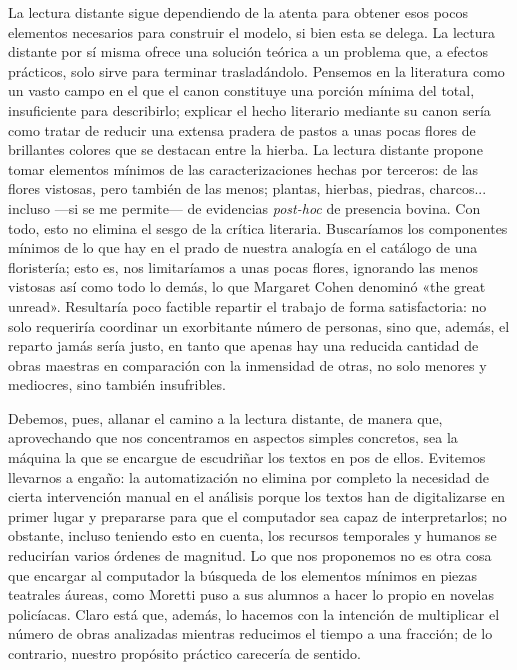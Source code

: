 La lectura distante sigue dependiendo de la atenta para obtener esos pocos elementos necesarios para construir el modelo, si bien esta se delega. La lectura distante por sí misma ofrece una solución teórica a un problema que, a efectos prácticos, solo sirve para terminar trasladándolo. Pensemos en la literatura como un vasto campo en el que el canon constituye una porción mínima del total, insuficiente para describirlo; explicar el hecho literario mediante su canon sería como tratar de reducir una extensa pradera de pastos a unas pocas flores de brillantes colores que se destacan entre la hierba. La lectura distante propone tomar elementos mínimos de las caracterizaciones hechas por terceros: de las flores vistosas, pero también de las menos; plantas, hierbas, piedras, charcos... incluso —si se me permite— de evidencias \textit{post-hoc} de presencia bovina. Con todo, esto no elimina el sesgo de la crítica literaria. Buscaríamos los componentes mínimos de lo que hay en el prado de nuestra analogía en el catálogo de una floristería; esto es, nos limitaríamos a unas pocas flores, ignorando las menos vistosas así como todo lo demás, lo que Margaret Cohen \parencite*[23]{cohen1999} denominó «the great unread». Resultaría poco factible repartir el trabajo de forma satisfactoria: no solo requeriría coordinar un exorbitante número de personas, sino que, además, el reparto jamás sería justo, en tanto que apenas hay una reducida cantidad de obras maestras en comparación con la inmensidad de otras, no solo menores y mediocres, sino también insufribles. 

Debemos, pues, allanar el camino a la lectura distante, de manera que, aprovechando que nos concentramos en aspectos simples concretos, sea la máquina la que se encargue de escudriñar los textos en pos de ellos. Evitemos llevarnos a engaño: la automatización no elimina por completo la necesidad de cierta intervención manual en el análisis porque los textos han de digitalizarse en primer lugar y prepararse para que el computador sea capaz de interpretarlos; no obstante, incluso teniendo esto en cuenta, los recursos temporales y humanos se reducirían varios órdenes de magnitud. Lo que nos proponemos no es otra cosa que encargar al computador la búsqueda de los elementos mínimos en piezas teatrales áureas, como Moretti \parencite*{moretti2000a} puso a sus alumnos a hacer lo propio en novelas policíacas. Claro está que, además, lo hacemos con la intención de multiplicar el número de obras analizadas mientras reducimos el tiempo a una fracción; de lo contrario, nuestro propósito práctico carecería de sentido.
